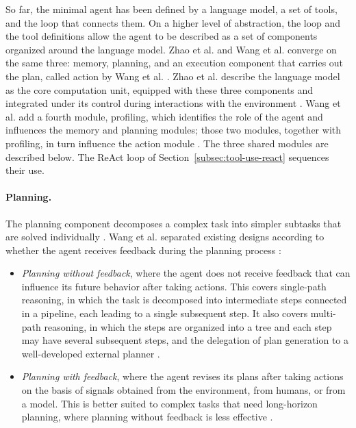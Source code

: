 So far, the minimal agent has been defined by a language model, a set of tools, and the loop that connects them. On a higher level of abstraction, the loop and the tool definitions allow the agent to be described as a set of components organized around the language model. Zhao et al. and Wang et al. converge on the same three: memory, planning, and an execution component that carries out the plan, called action by Wang et al. \cite{zhaoSurveyLargeLanguage2026, wangSurveyLargeLanguage2024}. Zhao et al. describe the language model as the core computation unit, equipped with these three components and integrated under its control during interactions with the environment \cite{zhaoSurveyLargeLanguage2026}. Wang et al. add a fourth module, profiling, which identifies the role of the agent and influences the memory and planning modules; those two modules, together with profiling, in turn influence the action module \cite{wangSurveyLargeLanguage2024}. The three shared modules are described below. The ReAct loop of Section~\ref{subsec:tool-use-react} sequences their use.

\paragraph{Planning.} The planning component decomposes a complex task into simpler subtasks that are solved individually \cite{wangSurveyLargeLanguage2024}. Wang et al. separated existing designs according to whether the agent receives feedback during the planning process \cite{wangSurveyLargeLanguage2024}:
\begin{itemize}
    \item \emph{Planning without feedback}, where the agent does not receive feedback that can influence its future behavior after taking actions. This covers single-path reasoning, in which the task is decomposed into intermediate steps connected in a pipeline, each leading to a single subsequent step. It also covers multi-path reasoning, in which the steps are organized into a tree and each step may have several subsequent steps, and the delegation of plan generation to a well-developed external planner \cite{wangSurveyLargeLanguage2024}.
    \item \emph{Planning with feedback}, where the agent revises its plans after taking actions on the basis of signals obtained from the environment, from humans, or from a model. This is better suited to complex tasks that need long-horizon planning, where planning without feedback is less effective \cite{wangSurveyLargeLanguage2024}.
\end{itemize}


